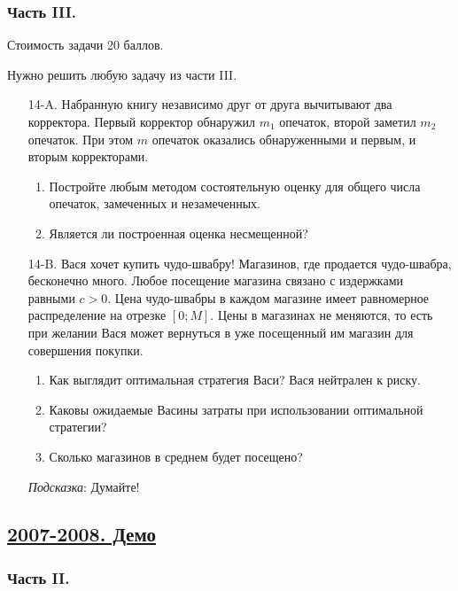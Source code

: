 \subsubsection*{Часть III.}

Стоимость задачи 20 баллов.

Нужно решить любую \textbf{} задачу из части III.

\begin{enumerate}
\item[14-A.] Набранную книгу независимо друг от друга вычитывают два корректора. Первый корректор обнаружил $m_{1}$ опечаток, второй заметил $m_{2}$ опечаток. При этом $m$ опечаток оказались обнаруженными и первым, и вторым корректорами.
\begin{enumerate}
\item Постройте любым методом состоятельную оценку для общего числа опечаток, замеченных и незамеченных.
\item Является ли построенная оценка несмещенной?
\end{enumerate}

\item[14-B.] Вася хочет купить чудо-швабру! Магазинов, где продается чудо-швабра, бесконечно много. Любое посещение магазина связано с издержками равными $c>0$. Цена чудо-швабры в каждом магазине имеет равномерное распределение на отрезке $[0;M]$. Цены в магазинах не меняются, то есть при желании Вася может вернуться в уже посещенный им магазин для совершения покупки.
\begin{enumerate}
\item Как выглядит оптимальная стратегия Васи? Вася нейтрален к риску.
\item Каковы ожидаемые Васины затраты при использовании оптимальной стратегии?
\item Сколько магазинов в среднем будет посещено?
\end{enumerate}
\emph{Подсказка}: Думайте!
\end{enumerate}


\subsection[2007-2008. Демо]{\hyperref[sec:sol_kr_03_2007_2008_demo]{2007-2008. Демо}}
\label{sec:kr_03_2007_2008_demo}

\subsubsection*{Часть II.}

